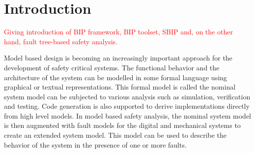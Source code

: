 
\section{Introduction}

\textcolor{red}{
Giving introduction of BIP framework, BIP toolset, SBIP and, on the other hand, fault tree-based safety analysis.
}

Model based design is becoming an increasingly important approach for the development of safety critical systems.
 The functional behavior and the architecture of the system can be modelled in some formal language using graphical or textual representations.
 This formal model is called the nominal system model can be subjected to various analysis such as simulation, verification and testing.
 Code generation is also supported to derive implementations directly from high level models.
 In model based safety analysis, the nominal system model is then augmented with fault models for the digital and mechanical systems to create an extended system model.
 This model can be used to describe the behavior of the system in the presence of one or more faults. 
  